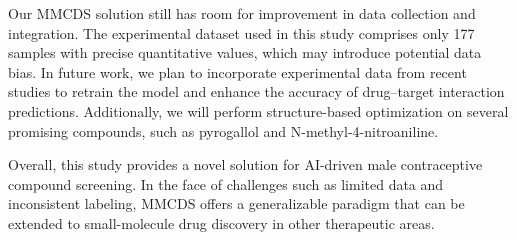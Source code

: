 \documentclass[unnumsec,webpdf,contemporary,large]{oup-authoring-template}%
\theoremstyle{thmstyleone}%
\theoremstyle{thmstyletwo}%
\theoremstyle{thmstylethree}%
\begin{document}
Our MMCDS solution still has room for improvement in data collection and integration. The experimental dataset used in this study comprises only 177 samples with precise quantitative values, which may introduce potential data bias.  In future work, we plan to incorporate experimental data from recent studies to retrain the model and enhance the accuracy of drug–target interaction predictions.  Additionally, we will perform structure-based optimization on several promising compounds, such as pyrogallol and N-methyl-4-nitroaniline.

Overall, this study provides a novel solution for AI-driven male contraceptive compound screening. In the face of challenges such as limited data and inconsistent labeling, MMCDS offers a generalizable paradigm that can be extended to small-molecule drug discovery in other therapeutic areas.






















\end{document}
